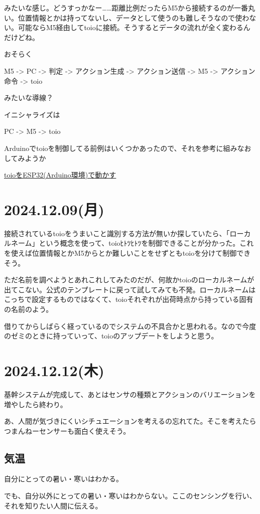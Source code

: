 \documentclass[fleqn,twocolumn]{mynote}
\begin{document}
  みたいな感じ。どうすっかなー……距離比例だったらM5から接続するのが一番丸い。位置情報とかは持ってないし、データとして使うのも難しそうなので使わない。可能ならM5経由してtoioに接続。そうするとデータの流れが全く変わるんだけどね。

  おそらく

  M5 -> PC -> 判定 -> アクション生成 -> アクション送信 -> M5 -> アクション命令 -> toio

  みたいな導線？

  イニシャライズは

  PC -> M5 -> toio

  Arduinoでtoioを制御してる前例はいくつかあったので、それを参考に組みなおしてみようか

  \href{https://note.com/vhideo/n/nff5e2845beb1}{toioをESP32(Arduino環境)で動かす}

  \section*{2024.12.09(月)}
  接続されているtoioをうまいこと識別する方法が無いか探していたら、「ローカルネーム」という概念を使って、toioﾋﾄﾂﾋﾄﾂを制御できることが分かった。これを使えば位置情報とかM5からとか難しいことをせずともtoioを分けて制御できそう。

  ただ名前を調べようとあれこれしてみたのだが、何故かtoioのローカルネームが出てこない。公式のテンプレートに戻って試してみても不発。ローカルネームはこっちで設定するものではなくて、toioそれぞれが出荷時点から持っている固有の名前のよう。

  借りてからしばらく経っているのでシステムの不具合かと思われる。なので今度のゼミのときに持っていって、toioのアップデートをしようと思う。

  \section*{2024.12.12(木)}
  基幹システムが完成して、あとはセンサの種類とアクションのバリエーションを増やしたら終わり。

  あ、人間が気づきにくいシチュエーションを考えるの忘れてた。そこを考えたらつまんねーセンサーも面白く使えそう。

  \subsection*{気温}
  自分にとっての暑い・寒いはわかる。

  でも、自分以外にとっての暑い・寒いはわからない。ここのセンシングを行い、それを知りたい人間に伝える。
\end{document}
